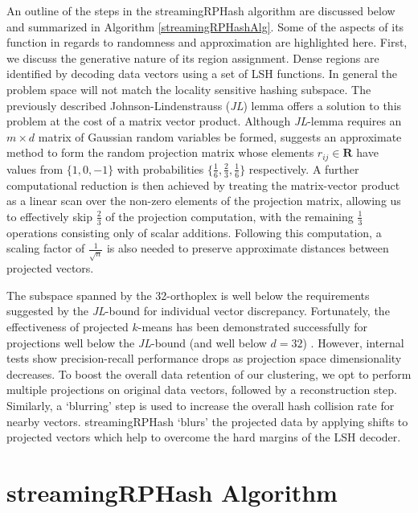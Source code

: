 An outline of the steps in the \textsf{streamingRPHash} algorithm are discussed below and summarized in Algorithm
\ref{streamingRPHashAlg}.  Some of the aspects of its function in regards to randomness and approximation are
highlighted here.  First, we discuss the generative nature of its region assignment.  Dense regions are identified by decoding data vectors
using a set of LSH functions.  In general the problem space will not match the locality sensitive hashing subspace.  The
previously described Johnson-Lindenstrauss (\emph{JL}) lemma offers a solution to this problem at the cost of a matrix
vector product.  Although \emph{JL}-lemma requires an $m\times d$ matrix of Gaussian random variables be formed,
\cite{Achlioptas01} suggests an approximate method to form the random projection matrix whose elements
$r_{ij}\in\textbf{R}$ have values from $\{1, 0, -1\}$ with probabilities $\{\frac{1}{6}, \frac{2}{3}, \frac{1}{6}\}$
respectively.  A further computational reduction is then achieved by treating the matrix-vector product as a linear scan
over the non-zero elements of the projection matrix, allowing us to effectively skip $\frac{2}{3}$ of the projection
computation, with the remaining $\frac{1}{3}$ operations consisting only of scalar additions.  Following this
computation, a scaling factor of ${\frac{1}{\sqrt{n}}}$ is also needed to preserve approximate distances between
projected vectors.

The subspace spanned by the 32-orthoplex is well below the requirements suggested by the \emph{JL}-bound for individual
vector discrepancy.  Fortunately, the effectiveness of projected $k$-means has been demonstrated successfully for
projections well below the \emph{JL}-bound (and well below $d = 32$) \cite{bartal,bingham}.  However, internal tests
show precision-recall performance drops as projection space dimensionality decreases.  To boost the overall data
retention of our clustering, we opt to perform multiple projections on original data vectors, followed by a
reconstruction step.  Similarly, a `blurring' step is used to increase the overall hash collision rate for nearby
vectors.  \textsf{streamingRPHash} `blurs' the projected data by applying shifts to projected vectors which help to
overcome the hard margins of the LSH decoder.

\section{\textsf{streamingRPHash} Algorithm} 

